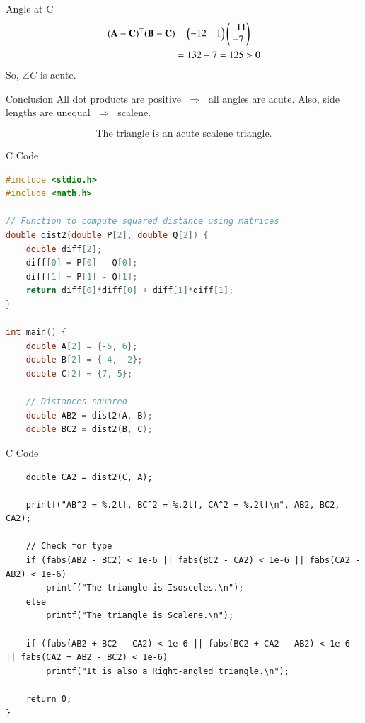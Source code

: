 \documentclass{beamer}
\begin{document}
\begin{frame}{Angle at C}
\begin{align}
(\mathbf{A}-\mathbf{C})^\top(\mathbf{B}-\mathbf{C})
&= \begin{pmatrix}-12 & 1\end{pmatrix}\begin{pmatrix}-11\\-7\end{pmatrix} \nonumber \\
&= 132-7 = 125 > 0 \label{eq:dotC}
\end{align}
So, $\angle C$ is acute.
\end{frame}

\begin{frame}{Conclusion}
All dot products are positive $\;\Rightarrow\;$ all angles are acute.  
Also, side lengths are unequal $\;\Rightarrow\;$ scalene.  

\[
\boxed{\text{The triangle is an acute scalene triangle.}}
\]
\end{frame}





\begin{frame}[fragile]{C Code}
\begin{lstlisting}[language=C]
#include <stdio.h>
#include <math.h>

// Function to compute squared distance using matrices
double dist2(double P[2], double Q[2]) {
    double diff[2];
    diff[0] = P[0] - Q[0];
    diff[1] = P[1] - Q[1];
    return diff[0]*diff[0] + diff[1]*diff[1];
}

int main() {
    double A[2] = {-5, 6};
    double B[2] = {-4, -2};
    double C[2] = {7, 5};

    // Distances squared
    double AB2 = dist2(A, B);
    double BC2 = dist2(B, C);
    \end{lstlisting}
\end{frame}

    \begin{frame}[fragile]{C Code}
\begin{lstlisting}
    double CA2 = dist2(C, A);

    printf("AB^2 = %.2lf, BC^2 = %.2lf, CA^2 = %.2lf\n", AB2, BC2, CA2);

    // Check for type
    if (fabs(AB2 - BC2) < 1e-6 || fabs(BC2 - CA2) < 1e-6 || fabs(CA2 - AB2) < 1e-6)
        printf("The triangle is Isosceles.\n");
    else
        printf("The triangle is Scalene.\n");

    if (fabs(AB2 + BC2 - CA2) < 1e-6 || fabs(BC2 + CA2 - AB2) < 1e-6 || fabs(CA2 + AB2 - BC2) < 1e-6)
        printf("It is also a Right-angled triangle.\n");

    return 0;
}
\end{lstlisting}
\end{frame}
\end{document}
